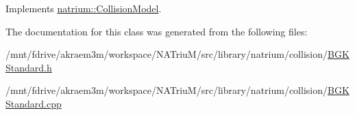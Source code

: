 Implements \hyperlink{classnatrium_1_1CollisionModel_a88b382d63da80e950bc58e8afad769a6}{natrium::CollisionModel}.

The documentation for this class was generated from the following files:\begin{DoxyCompactItemize}
\item 
/mnt/fdrive/akraem3m/workspace/NATriuM/src/library/natrium/collision/\hyperlink{BGKStandard_8h}{BGKStandard.h}\item 
/mnt/fdrive/akraem3m/workspace/NATriuM/src/library/natrium/collision/\hyperlink{BGKStandard_8cpp}{BGKStandard.cpp}\end{DoxyCompactItemize}
